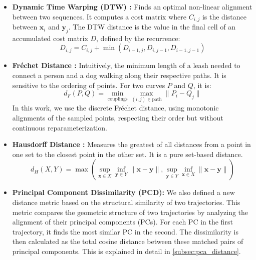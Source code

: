 \documentclass[a4paper,12pt]{article}
\begin{document}
\begin{itemize}
    \item \textbf{Dynamic Time Warping (DTW) \cite{SalvadorChan2007}:} Finds an optimal non-linear alignment between two sequences. It computes a cost matrix where $C_{i,j}$ is the distance between $\mathbf{x}_i$ and $\mathbf{y}_j$. The DTW distance is the value in the final cell of an accumulated cost matrix $D$, defined by the recurrence:
    \begin{equation}
        D_{i,j} = C_{i,j} + \min(D_{i-1, j}, D_{i, j-1}, D_{i-1, j-1})
    \end{equation}
    \item \textbf{Fréchet Distance \cite{Denaxas2023} \cite{EiterMannila1994}:} Intuitively, the minimum length of a leash needed to connect a person and a dog walking along their respective paths. It is sensitive to the ordering of points. For two curves $P$ and $Q$, it is:
        \begin{equation}
            d_F(P, Q) = \min_{\text{couplings}} \max_{(i, j) \in \text{path}} \| P_i - Q_j \|
        \end{equation}
        In this work, we use the discrete Fréchet distance, using monotonic alignments of the sampled points, respecting their order but without continuous reparameterization.
    \item \textbf{Hausdorff Distance \cite{SciPyDirectedHausdorff}:} Measures the greatest of all distances from a point in one set to the closest point in the other set. It is a pure set-based distance.
    \begin{equation}
        d_H(X, Y) = \max \left( \sup_{\mathbf{x} \in X} \inf_{\mathbf{y} \in Y} \|\mathbf{x}-\mathbf{y}\|, \sup_{\mathbf{y} \in Y} \inf_{\mathbf{x} \in X} \|\mathbf{x}-\mathbf{y}\| \right)
    \end{equation}
    \item \textbf{Principal Component Dissimilarity (PCD):} We also defined a new distance metric based on the structural similarity of two trajectories. This metric compares the geometric structure of two trajectories by analyzing the alignment of their principal components (PCs). For each PC in the first trajectory, it finds the most similar PC in the second. The dissimilarity is then calculated as the total cosine distance between these matched pairs of principal components. This is explained in detail in \ref{subsec:pca_distance}.


\end{itemize}
\end{document}
